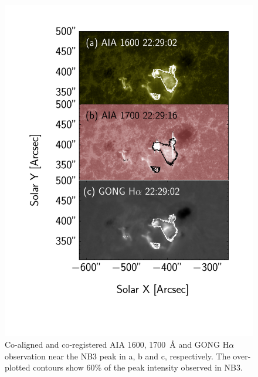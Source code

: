 \begin{figure}
    \centering
    \hspace{-1cm}
   \includegraphics[trim={1.5cm 2.5cm 1.5cm 1cm},clip,width=\linewidth]{Figures/feb_22nd/suit_roi_aia_peak.pdf}
    \caption[AIA and GONG observations of the flare]{Co-aligned and co-registered AIA 1600, 1700~{\AA} and GONG H{$\alpha$} observation near the NB3 peak in a, b and c, respectively. The over-plotted contours show 60\% of the peak intensity observed in NB3.}\label{aia}
\end{figure}

